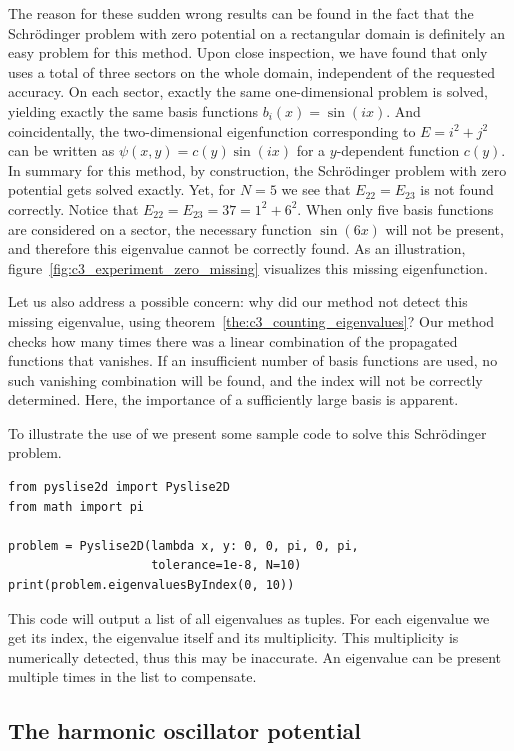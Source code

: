 The reason for these sudden wrong results can be found in the fact that the Schrödinger problem with zero potential on a rectangular domain is definitely an easy problem for this method. Upon close inspection, we have found that \pyslisetd{} only uses a total of three sectors on the whole domain, independent of the requested accuracy. On each sector, exactly the same one-dimensional problem is solved, yielding exactly the same basis functions $b_i(x) = \sin(i x)$. And coincidentally, the two-dimensional eigenfunction corresponding to $E = i^2 + j^2$ can be written as $\psi(x, y) = c(y) \sin(i x)$ for a $y$-dependent function $c(y)$. In summary for this method, by construction, the Schrödinger problem with zero potential gets solved exactly. Yet, for $N=5$ we see that $E_{22} = E_{23}$ is not found correctly. Notice that $E_{22} = E_{23} = 37 = 1^2 + 6^2$. When only five basis functions are considered on a sector, the necessary function $\sin(6 x)$ will not be present, and therefore this eigenvalue cannot be correctly found. As an illustration, figure~\ref{fig:c3_experiment_zero_missing} visualizes this missing eigenfunction.

Let us also address a possible concern: why did our method not detect this missing eigenvalue, using theorem~\ref{the:c3_counting_eigenvalues}? Our method checks how many times there was a linear combination of the propagated functions that vanishes. If an insufficient number of basis functions are used, no such vanishing combination will be found, and the index will not be correctly determined. Here, the importance of a sufficiently large basis is apparent.

To illustrate the use of \pyslisetd{} we present some sample code to solve this Schrödinger problem.
\begin{verbatim}
from pyslise2d import Pyslise2D
from math import pi

problem = Pyslise2D(lambda x, y: 0, 0, pi, 0, pi,
                    tolerance=1e-8, N=10)
print(problem.eigenvaluesByIndex(0, 10))
\end{verbatim}
This code will output a list of all eigenvalues as tuples. For each eigenvalue we get its index, the eigenvalue itself and its multiplicity. This multiplicity is numerically detected, thus this may be inaccurate. An eigenvalue can be present multiple times in the list to compensate.


\subsection{The harmonic oscillator potential}\label{sec:c3_experiment_harmonic}

